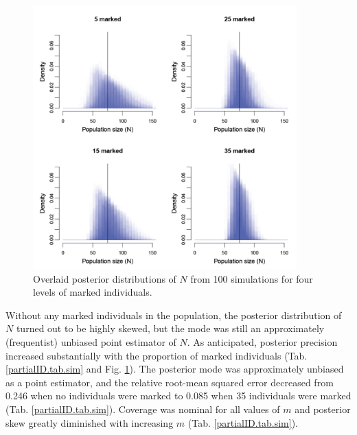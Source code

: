 
\begin{figure}[ht]
  \centering
  \includegraphics[width=4in,height=4in]{Ch19-PartialID/figs/Nposts2.png}
  \caption{Overlaid posterior distributions of $N$ from 100 simulations
    for four levels of marked individuals.}
  \label{partialID.fig.nposts}
\end{figure}

Without any marked individuals in the population, the posterior
distribution of $N$ turned out to be highly skewed, but the mode was
still an approximately (frequentist) unbiased point estimator of
$N$. As anticipated, posterior precision increased substantially with
the proportion of marked individuals (Tab. \ref{partialID.tab.sim} and
Fig. \ref{partialID.fig.nposts}). The posterior mode was approximately
unbiased as a point estimator, and the relative root-mean squared
error decreased from 0.246 when no individuals were marked to 0.085
when 35 individuals were marked
(Tab. \ref{partialID.tab.sim}). Coverage was nominal for all values of
$m$ and posterior skew greatly diminished with increasing $m$ (Tab. \ref{partialID.tab.sim}).

